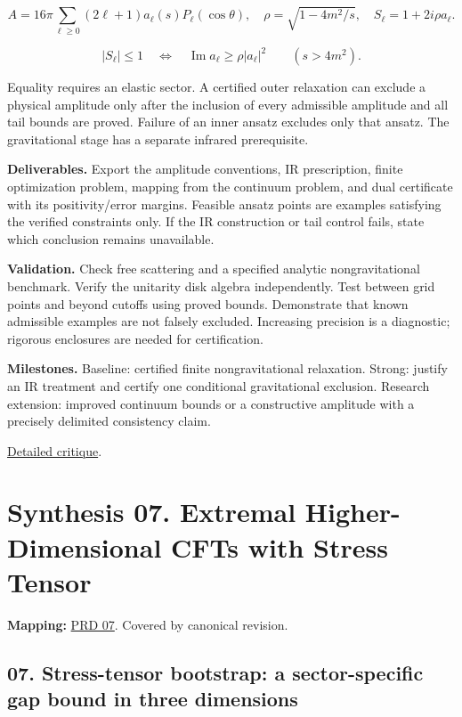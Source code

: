 \documentclass[
  11pt,
]{article}
\begin{document}
\[A=16\pi\sum_{\ell\ge0}(2\ell+1)a_\ell(s)P_\ell(\cos\theta),\quad
\rho=\sqrt{1-4m^2/s},\quad S_\ell=1+2i\rho a_\ell.\]

\[|S_\ell|\le1\quad\Longleftrightarrow\quad
\operatorname{Im}a_\ell\ge\rho|a_\ell|^2\qquad(s>4m^2).\]

Equality requires an elastic sector. A certified outer relaxation can
exclude a physical amplitude only after the inclusion of every
admissible amplitude and all tail bounds are proved. Failure of an inner
ansatz excludes only that ansatz. The gravitational stage has a separate
infrared prerequisite.

\textbf{Deliverables.} Export the amplitude conventions, IR
prescription, finite optimization problem, mapping from the continuum
problem, and dual certificate with its positivity/error margins.
Feasible ansatz points are examples satisfying the verified constraints
only. If the IR construction or tail control fails, state which
conclusion remains unavailable.

\textbf{Validation.} Check free scattering and a specified analytic
nongravitational benchmark. Verify the unitarity disk algebra
independently. Test between grid points and beyond cutoffs using proved
bounds. Demonstrate that known admissible examples are not falsely
excluded. Increasing precision is a diagnostic; rigorous enclosures are
needed for certification.

\textbf{Milestones.} Baseline: certified finite nongravitational
relaxation. Strong: justify an IR treatment and certify one conditional
gravitational exclusion. Research extension: improved continuum bounds
or a constructive amplitude with a precisely delimited consistency
claim.

\href{https://github.com/rick-stevens-ai/Pure-Thought/blob/main/reviews/06-Nonperturbative-S-matrix-Bootstrap.md}{Detailed
critique}.

\section{Synthesis 07. Extremal Higher-Dimensional CFTs with Stress
Tensor}

\textbf{Mapping:}
\href{https://github.com/rick-stevens-ai/Pure-Thought/blob/main/PRDs/07-Extremal-CFTs-Stress-Tensor.md}{PRD
07}. Covered by canonical revision.

\subsection{07. Stress-tensor bootstrap: a sector-specific gap bound in
three dimensions}
\end{document}
